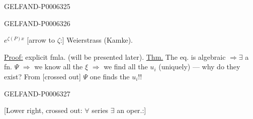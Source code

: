 \begin{GelfandAdjacentEvidence}{GELFAND-P000632}{5}

\end{GelfandAdjacentEvidence}
\begin{GelfandAdjacentEvidence}{GELFAND-P000632}{6}

\(e^{\zeta(P)x}\) [arrow to \(\zeta\):] Weierstrass (Kamke).

\underline{Proof:} explicit fmla. (will be presented later).
\underline{Thm.} The eq. is algebraic \(\Rightarrow\exists\) a fn. \(\Psi\)
\(\Rightarrow\) we know all the \(\xi\)
\(\Rightarrow\) we find all the \(u_i\) (uniquely) --- why do they exist?
From [crossed out] \(\Psi\) one finds the \(u_i\)!!
\end{GelfandAdjacentEvidence}
\begin{GelfandAdjacentEvidence}{GELFAND-P000632}{7}

[Lower right, crossed out: \(\forall\) series \(\exists\) an oper.:]
\end{GelfandAdjacentEvidence}



